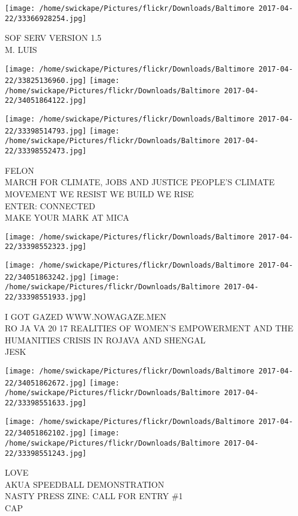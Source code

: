 \documentclass[10pt,letterpaper]{article}
\begin{document}
\vspace{0.25in}
\texttt{[image: /home/swickape/Pictures/flickr/Downloads/Baltimore 2017-04-22/33366928254.jpg]}

SOF SERV VERSION 1.5\\
M. LUIS\\
\pagebreak

\texttt{[image: /home/swickape/Pictures/flickr/Downloads/Baltimore 2017-04-22/33825136960.jpg]}
\texttt{[image: /home/swickape/Pictures/flickr/Downloads/Baltimore 2017-04-22/34051864122.jpg]}

\texttt{[image: /home/swickape/Pictures/flickr/Downloads/Baltimore 2017-04-22/33398514793.jpg]}
\texttt{[image: /home/swickape/Pictures/flickr/Downloads/Baltimore 2017-04-22/33398552473.jpg]}

FELON\\
MARCH FOR CLIMATE, JOBS AND JUSTICE PEOPLE'S CLIMATE MOVEMENT WE RESIST WE BUILD WE RISE\\
ENTER: CONNECTED\\
MAKE YOUR MARK AT MICA\\
\pagebreak

\texttt{[image: /home/swickape/Pictures/flickr/Downloads/Baltimore 2017-04-22/33398552323.jpg]}

\vspace{0.25in}
\texttt{[image: /home/swickape/Pictures/flickr/Downloads/Baltimore 2017-04-22/34051863242.jpg]}
\texttt{[image: /home/swickape/Pictures/flickr/Downloads/Baltimore 2017-04-22/33398551933.jpg]}

I GOT GAZED WWW.NOWAGAZE.MEN\\
RO JA VA 20 17 REALITIES OF WOMEN'S EMPOWERMENT AND THE HUMANITIES CRISIS IN ROJAVA AND SHENGAL\\
JESK\\
\pagebreak

\texttt{[image: /home/swickape/Pictures/flickr/Downloads/Baltimore 2017-04-22/34051862672.jpg]}
\texttt{[image: /home/swickape/Pictures/flickr/Downloads/Baltimore 2017-04-22/33398551633.jpg]}

\texttt{[image: /home/swickape/Pictures/flickr/Downloads/Baltimore 2017-04-22/34051862102.jpg]}
\texttt{[image: /home/swickape/Pictures/flickr/Downloads/Baltimore 2017-04-22/33398551243.jpg]}

LOVE\\
AKUA SPEEDBALL DEMONSTRATION\\
NASTY PRESS ZINE: CALL FOR ENTRY \#1\\
CAP\\
\pagebreak
\end{document}
